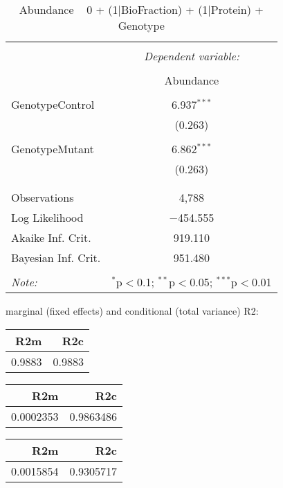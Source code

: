 \documentclass[11pt]{report}
\begin{document}
\begin{table}[!htbp] \centering 
  \caption{Abundance ~ 0 + (1|BioFraction) + (1|Protein) + Genotype} 
  \label{} 
\begin{tabular}{@{\extracolsep{5pt}}lc} 
\\[-1.8ex]\hline 
\hline \\[-1.8ex] 
 & \multicolumn{1}{c}{\textit{Dependent variable:}} \\ 
\cline{2-2} 
\\[-1.8ex] & Abundance \\ 
\hline \\[-1.8ex] 
 GenotypeControl & 6.937$^{***}$ \\ 
  & (0.263) \\ 
  & \\ 
 GenotypeMutant & 6.862$^{***}$ \\ 
  & (0.263) \\ 
  & \\ 
\hline \\[-1.8ex] 
Observations & 4,788 \\ 
Log Likelihood & $-$454.555 \\ 
Akaike Inf. Crit. & 919.110 \\ 
Bayesian Inf. Crit. & 951.480 \\ 
\hline 
\hline \\[-1.8ex] 
\textit{Note:}  & \multicolumn{1}{r}{$^{*}$p$<$0.1; $^{**}$p$<$0.05; $^{***}$p$<$0.01} \\ 
\end{tabular} 
\end{table} 
marginal (fixed effects) and conditional (total variance) R2:

\begin{tabular}{r|r}
\hline
R2m & R2c\\
\hline
0.9883 & 0.9883\\
\hline
\end{tabular}

\begin{tabular}{r|r}
\hline
R2m & R2c\\
\hline
0.0002353 & 0.9863486\\
\hline
\end{tabular}

\begin{tabular}{r|r}
\hline
R2m & R2c\\
\hline
0.0015854 & 0.9305717\\
\hline
\end{tabular}
\end{document}
